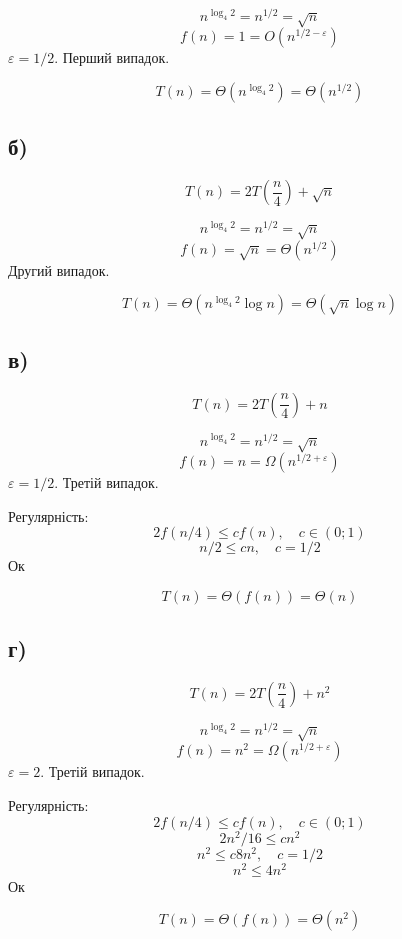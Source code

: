 \documentclass[11pt, a4paper]{article} %
\begin{document}
$$n^{\log_4 2} = n^{1/2} = \sqrt n$$
$$f(n) = 1 = O(n^{1/2-\varepsilon})$$
$\varepsilon = 1/2$. Перший випадок.
\begin{mdframed}[style=ans]
    $$T(n) = \Theta(n^{\log_4 2}) = \Theta(n^{1/2})$$
\end{mdframed}

\subsection*{б)}
\begin{mdframed}
    $$T(n) = 2T(\frac{n}{4}) + \sqrt n$$
\end{mdframed}

$$n^{\log_4 2} = n^{1/2} = \sqrt n$$
$$f(n) = \sqrt n = \Theta(n^{1/2})$$
Другий випадок.
\begin{mdframed}[style=ans]
    $$T(n) = \Theta(n^{\log_4 2} \log n) = \Theta(\sqrt n \log n)$$
\end{mdframed}

\subsection*{в)}
\begin{mdframed}
    $$T(n) = 2T(\frac{n}{4}) + n$$
\end{mdframed}

$$n^{\log_4 2} = n^{1/2} = \sqrt n$$
$$f(n) = n = \Omega(n^{1/2+\varepsilon})$$
$\varepsilon = 1/2$. Третій випадок.

Регулярність:
$$2f(n/4) \le c f(n),\quad c\in (0;1)$$
$$n/2 \le c n, \quad c=1/2$$
Ок

\begin{mdframed}[style=ans]
    $$T(n) = \Theta(f(n)) = \Theta(n)$$
\end{mdframed}

\subsection*{г)}
\begin{mdframed}
    $$T(n) = 2T(\frac{n}{4}) + n^2$$
\end{mdframed}

$$n^{\log_4 2} = n^{1/2} = \sqrt n$$
$$f(n) = n^2 = \Omega(n^{1/2+\varepsilon})$$
$\varepsilon = 2$. Третій випадок.

Регулярність:
$$2f(n/4) \le c f(n),\quad c\in (0;1)$$
$$2n^2/16 \le c n^2$$
$$n^2 \le c 8n^2, \quad c = 1/2$$
$$n^2 \le 4n^2$$
Ок

\begin{mdframed}[style=ans]
    $$T(n) = \Theta(f(n)) = \Theta(n^2)$$
\end{mdframed}
\end{document}
